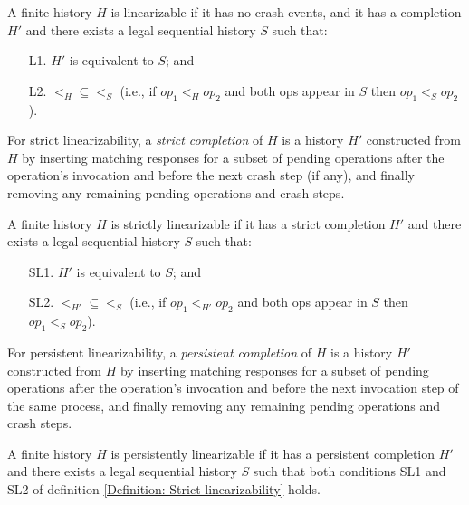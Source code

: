 \begin{definition} [Linearizability]
	\label{Definition: Linearizability}
	A finite history $H$ is linearizable if it has no crash events, and it has a completion $H'$ and there exists a legal sequential history $S$ such that:
	\begin{enumerate}
		\item [L1.] $H'$ is equivalent to $S$; and
		\item [L2.] $<_H \subseteq <_S$ (i.e., if $op_1 <_H op_2$ and both ops appear in $S$ then $op_1 <_S op_2$).
	\end{enumerate}
\end{definition}

For strict linearizability, a \textit{strict completion} of $H$ is a history $H'$ constructed from $H$ by inserting matching responses for a subset of pending operations after the operation’s invocation and before the next crash step (if any), and finally removing any remaining pending operations and crash steps.

\begin{definition} 
	\label{Definition: Strict linearizability} 
	A finite history $H$ is strictly linearizable if it has a strict completion $H'$ and there exists a legal sequential history $S$ such that:
	\begin{enumerate}
		\item [SL1.] $H'$ is equivalent to $S$; and
		\item [SL2.] $<_{H'} \subseteq <_S$ (i.e., if $op_1 <_{H'} op_2$ and both ops appear in $S$ then $op_1 <_S op_2$).
	\end{enumerate}
\end{definition}

For persistent linearizability, a \textit{persistent completion} of $H$ is a history $H'$ constructed from $H$ by inserting matching responses for a subset of pending operations after the operation’s invocation and before the next invocation step of the same process, and finally removing any remaining pending operations and crash steps.

\begin{definition} 
	\label{Definition: Persistent linearizability}
	A finite history $H$ is persistently linearizable if it has a persistent completion $H'$ and there exists a legal sequential history $S$ such that both conditions SL1 and SL2 of definition \ref{Definition: Strict linearizability} holds.
\end{definition}


